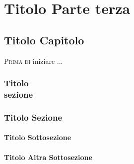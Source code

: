 
\part{Titolo Parte terza}\label{terza}
\chapter[Titolo Capitolo]{Titolo Capitolo}
\lettrine[lines=1]{P}{rima di} iniziare ...

\section[Titolo Sezione]
{Titolo \\ sezione}\label{sec:dip}

\section{Titolo Sezione}
\subsection{Titolo Sottosezione}

\subsection{Titolo Altra Sottosezione}



